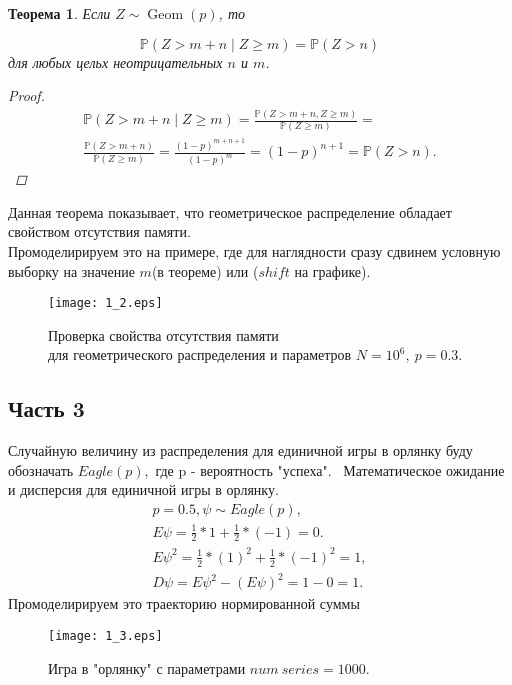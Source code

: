\documentclass[11pt]{article}
\newtheorem{theorem}{Теорема}[section]
\begin{document}
\begin{theorem}
  Если $Z \sim \operatorname{Geom}(p)$, то

$$
\mathbb{P}(Z>m+n \mid Z \geqslant m)=\mathbb{P}(Z>n)
$$
для любых цельх неотрицательных $n$ и $m$.
\begin{proof}
 $$
\begin{aligned}
\mathbb{P}(Z>m+n \mid Z \geqslant m)=\frac{\mathbb{P}(Z>m+n, Z \geqslant m)}{\mathbb{P}(Z \geqslant m)}= \\
\frac{\mathbb{P}(Z>m+n)}{\mathbb{P}(Z \geqslant m)}=\frac{(1-p)^{m+n+1}}{(1-p)^m}=(1-p)^{n+1}=\mathbb{P}(Z>n) .
\end{aligned}
$$

\end{proof}
\end{theorem}
Данная теорема показывает, что геометрическое распределение обладает свойством отсутствия памяти.\\
Промоделирируем это на примере, где для наглядности сразу сдвинем условную выборку на значение $m$(в теореме) или  ($shift$ на графике).
\begin{figure}[h]

    \texttt{[image: 1\_2.eps]} 
    \caption{Проверка свойства отсутствия памяти \\ 
    для геометрического распределения и параметров $N=10^6,~ p=0.3$.}
\end{figure}  
\FloatBarrier


\subsection{Часть 3}

Случайную величину из распределения для единичной игры в орлянку буду обозначать $Eagle(p)$,\
где p - вероятность "успеха". \
Математическое ожидание и дисперсия для единичной игры в орлянку.
$$
\begin{gathered}
    p = 0.5, \psi \sim Eagle(p), \\
E \psi = \frac{1}{2} * 1 + \frac{1}{2} * (-1) = 0. \\
E \psi^2 = \frac{1}{2} * (1)^2 + \frac{1}{2} * (-1)^2 = 1, \\
D \psi = E \psi^2 - (E \psi)^2 = 1 - 0 = 1.
\end{gathered}
$$
Промоделирируем это траекторию нормированной суммы
\begin{figure}[ht]

    \texttt{[image: 1\_3.eps]} 
    \caption{Игра в "орлянку" с параметрами $num~series=1000$.}
\end{figure}  
\end{document}
